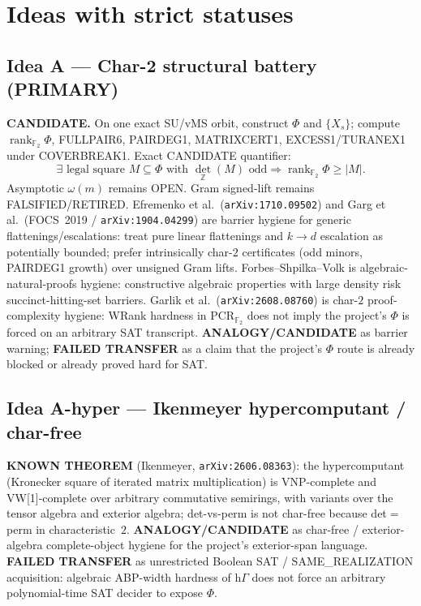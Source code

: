 \documentclass[11pt]{article}
\begin{document}
\section*{Ideas with strict statuses}
\subsection*{Idea A --- Char-2 structural battery (PRIMARY)}
\textbf{CANDIDATE.} On one exact SU/vMS orbit, construct $\Phi$ and $\{X_s\}$;
compute $\operatorname{rank}_{\mathbb F_2}\Phi$, FULLPAIR6, PAIRDEG1, MATRIXCERT1,
EXCESS1/TURANEX1 under COVERBREAK1. Exact CANDIDATE quantifier:
\[
\exists\text{ legal square }M\subseteq\Phi\text{ with }\det_{\mathbb Z}(M)\text{ odd}
\Rightarrow\operatorname{rank}_{\mathbb F_2}\Phi\ge|M|.
\]
Asymptotic $\omega(m)$ remains OPEN. Gram signed-lift remains FALSIFIED/RETIRED.
Efremenko et al.\ (\texttt{arXiv:1710.09502}) and Garg et al.\ (FOCS~2019 /
\texttt{arXiv:1904.04299}) are barrier hygiene for generic flattenings/escalations:
treat pure linear flattenings and $k\to d$ escalation as potentially bounded;
prefer intrinsically char-$2$ certificates (odd minors, PAIRDEG1 growth) over
unsigned Gram lifts. Forbes--Shpilka--Volk is algebraic-natural-proofs hygiene:
constructive algebraic properties with large density risk succinct-hitting-set
barriers. Garlik et al.\ (\texttt{arXiv:2608.08760}) is char-$2$ proof-complexity
hygiene: WRank hardness in PCR$_{\mathbb F_2}$ does not imply the project's
$\Phi$ is forced on an arbitrary SAT transcript.
\textbf{ANALOGY/CANDIDATE} as barrier warning; \textbf{FAILED TRANSFER} as a claim
that the project's $\Phi$ route is already blocked or already proved hard for SAT.

\subsection*{Idea A-hyper --- Ikenmeyer hypercomputant / char-free}
\textbf{KNOWN THEOREM} (Ikenmeyer, \texttt{arXiv:2606.08363}): the hypercomputant
(Kronecker square of iterated matrix multiplication) is VNP-complete and
VW[1]-complete over arbitrary commutative semirings, with variants over the
tensor algebra and exterior algebra; det-vs-perm is not char-free because
det$=$perm in characteristic~$2$.
\textbf{ANALOGY/CANDIDATE} as char-free / exterior-algebra complete-object
hygiene for the project's exterior-span language.
\textbf{FAILED TRANSFER} as unrestricted Boolean SAT / SAME\_REALIZATION
acquisition: algebraic ABP-width hardness of $\mathrm{h}\Gamma$ does not force
an arbitrary polynomial-time SAT decider to expose $\Phi$.
\end{document}
